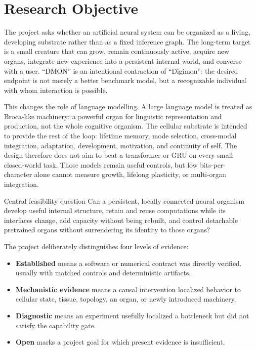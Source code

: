 \documentclass[11pt]{article}
\newcommand{\established}{\textcolor{DmonGreen}{\textbf{Established}}}
\newcommand{\mechanistic}{\textcolor{DmonBlue}{\textbf{Mechanistic evidence}}}
\newcommand{\diagnostic}{\textcolor{DmonGold}{\textbf{Diagnostic}}}
\newcommand{\openclaim}{\textcolor{DmonRed}{\textbf{Open}}}
\begin{document}
\tableofcontents
\clearpage

\section{Research Objective}

The project asks whether an artificial neural system can be organized as a living,
developing substrate rather than as a fixed inference graph. The long-term target is a
small creature that can grow, remain continuously active, acquire new organs, integrate
new experience into a persistent internal world, and converse with a user. ``DMON'' is
an intentional contraction of ``Digimon'': the desired endpoint is not merely a better
benchmark model, but a recognizable individual with whom interaction is possible.

This changes the role of language modelling. A large language model is treated as
Broca-like machinery: a powerful organ for linguistic representation and production,
not the whole cognitive organism. The cellular substrate is intended to provide the
rest of the loop: lifetime memory, mode selection, cross-modal integration, adaptation,
development, motivation, and continuity of self. The design therefore does not aim to
beat a transformer or GRU on every small closed-world task. Those models remain useful
controls, but low bits-per-character alone cannot measure growth, lifelong plasticity,
or multi-organ integration.

\begin{claimbox}{Central feasibility question}
Can a persistent, locally connected neural organism develop useful internal structure,
retain and reuse computations while its interfaces change, add capacity without being
rebuilt, and control detachable pretrained organs without surrendering its identity to
those organs?
\end{claimbox}

The project deliberately distinguishes four levels of evidence:

\begin{itemize}
  \item \established{} means a software or numerical contract was directly verified,
        usually with matched controls and deterministic artifacts.
  \item \mechanistic{} means a causal intervention localized behavior to cellular state,
        tissue, topology, an organ, or newly introduced machinery.
  \item \diagnostic{} means an experiment usefully localized a bottleneck but did not
        satisfy the capability gate.
  \item \openclaim{} marks a project goal for which present evidence is insufficient.
\end{itemize}
\end{document}
